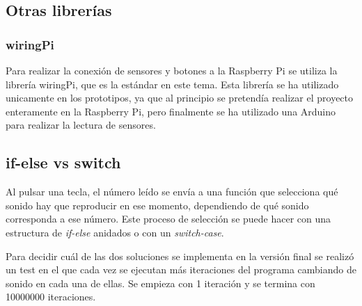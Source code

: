 

        \subsection{Otras librerías} %
        \label{sub:OtrasLibrerias}

            \subsubsection{wiringPi} %
            \label{ssub:WiringPi}

                Para realizar la conexión de sensores y botones a la Raspberry Pi se utiliza la librería
                wiringPi\cite{wiringPi}, que es la estándar en este tema. Esta librería se ha utilizado unicamente en
                los prototipos, ya que al principio se pretendía realizar el proyecto enteramente en la Raspberry Pi,
                pero finalmente se ha utilizado una Arduino para realizar la lectura de sensores.



        \subsection{if-else vs switch} %
        \label{sub:if-else_vs_switch}

            Al pulsar una tecla, el número leído se envía a una función que selecciona qué sonido hay que reproducir en
            ese momento, dependiendo de qué sonido corresponda a ese número. Este proceso de selección se puede hacer
            con una estructura de \textit{if-else} anidados o con un \textit{switch-case}.

            Para decidir cuál de las dos soluciones se implementa en la versión final se realizó un test en el que cada
            vez se ejecutan más iteraciones del programa cambiando de sonido en cada una de ellas. Se empieza con 1
            iteración y se termina con 10000000 iteraciones.

